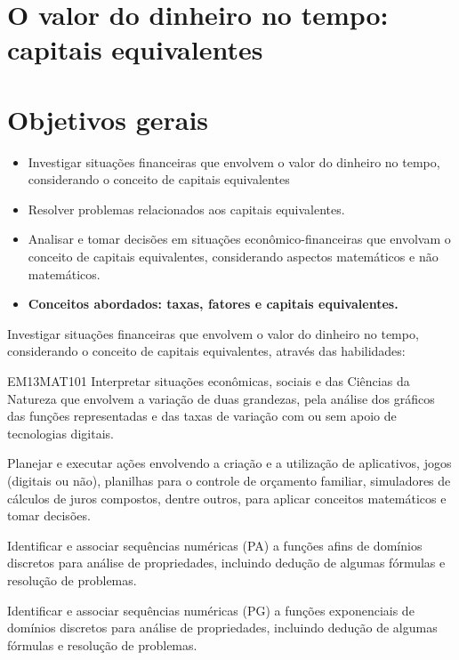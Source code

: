 \begin{paginatexto}

\section*{O valor do dinheiro no tempo: capitais equivalentes}

\section*{Objetivos gerais}

\begin{itemize}
\item Investigar situações financeiras que envolvem o valor do dinheiro no tempo, considerando o conceito de capitais equivalentes 
\item Resolver problemas relacionados aos capitais equivalentes.
\item Analisar e tomar decisões em situações econômico-financeiras que envolvam o conceito de capitais equivalentes, considerando aspectos matemáticos e não matemáticos.

\item \textbf{Conceitos abordados: taxas, fatores e capitais equivalentes.}
\end{itemize}


Investigar situações financeiras que envolvem o valor do dinheiro no tempo, considerando o conceito de capitais equivalentes, através das habilidades:

\begin{habilities}{EM13MAT101}
 Interpretar situações econômicas, sociais e das Ciências da Natureza
que envolvem a variação de duas grandezas, pela análise dos gráficos das funções representadas e das taxas de variação com ou sem apoio de tecnologias digitais.

Planejar e executar ações envolvendo a criação e a utilização de aplicativos, jogos (digitais ou não), planilhas para o controle de orçamento familiar, simuladores de cálculos de juros compostos, dentre outros, para aplicar conceitos matemáticos e tomar decisões. 

Identificar e associar sequências numéricas (PA) a funções afins de domínios discretos para análise de propriedades, incluindo dedução de algumas fórmulas e resolução de problemas.

Identificar e associar sequências numéricas (PG) a funções exponenciais de domínios discretos para análise de propriedades, incluindo dedução de algumas fórmulas e resolução de problemas.
\end{habilities}


\end{paginatexto}
